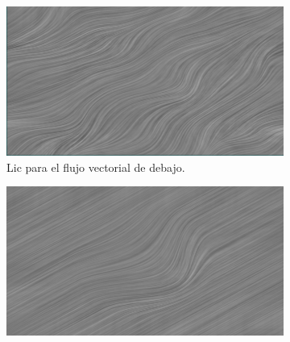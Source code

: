 \begin{figure}
	\centering	
	\begin{subfigure}{0.45\textwidth}
		\includegraphics[height=\textwidth,width=\textwidth]{figures/mylic.png}
		\caption{Lic para el flujo vectorial de debajo.}
		\label{fig:mylic1}
	\end{subfigure}
	\hfill
	\begin{subfigure}{0.45\textwidth}
		\includegraphics[height=\textwidth,width=\textwidth]{figures/mylic2.png}

\end{subfigure}
\end{figure}
